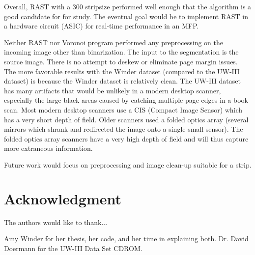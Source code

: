 \documentclass[conference]{IEEEtran}
\begin{document}
Overall, RAST with a 300 stripsize performed well enough that the algorithm is
a good candidate for for study. The eventual goal would be to implement RAST in
a hardware circuit (ASIC) for real-time performance in an MFP.

Neither RAST nor Voronoi program performed any preprocessing on the incoming
image other than binarization. The input to the segmentation is the source
image. There is no attempt to deskew or eliminate page margin issues. The more
favorable results with the Winder dataset (compared to the UW-III dataset) is
because the Winder dataset is relatively clean. The UW-III dataset has many
artifacts that would be unlikely in a modern desktop scanner, especially the
large black areas caused by catching multiple page edges in a book scan. Most
modern desktop scanners use a CIS (Compact Image Sensor) which has a very short
depth of field. Older scanners used a folded optics array (several mirrors
which shrank and redirected the image onto a single small sensor). The
folded optics array scanners have a very high depth of field and will thus
capture more extraneous information.

Future work would focus on preprocessing and image clean-up suitable for a
strip. 



\section*{Acknowledgment}


The authors would like to thank...

Amy Winder for her thesis, her code, and her time in explaining both.  
Dr. David Doermann for the UW-III Data Set CDROM.


\end{document}
